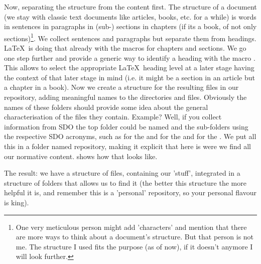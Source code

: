 
Now, separating the structure from the content first. The structure of a 
document (we stay with classic text documents like articles, books, etc. 
for a while) is words in sentences in paragraphs in (sub-) sections in 
chapters (if its a book, of not only sections)\footnote{One very 
meticulous person might add 'characters' and mention that there are more 
ways to think about a document's structure. But that person is not me. The 
structure I used fits the purpose (as of now), if it doesn't anymore I 
will look further.}. We collect sentences and paragraphs but separate them 
from headings. \LaTeX~is doing that already with the macros for chapters and 
sections. We go one step further and provide a generic way to identify a 
heading with the  macro \cmd{\setheading}. This allows to select the appropriate
\LaTeX~heading level at a later stage having the context of that later stage in mind
(i.e. it might be a section in an article but a chapter in a book). Now we create 
a structure for the resulting files in our repository, adding meaningful names to 
the directories and files. Obviously the names of these folders should provide some
idea about the general characterisation of the files they contain. Example? Well, if you collect 
information from \acs{SDO} the top folder 
could be named  and the sub-folders using the 
respective \ac{SDO} acronyms, such as  for the  and 
 for the  and  for the
. We put all this in a folder named repository, making it explicit
that here is were we find all our normative content.
 shows how that looks like.


The result: we have a structure of files, containing our 'stuff', 
integrated in a structure of folders that allows us to find it (the better 
this structure the more helpful it is, and remember this is a 'personal' 
repository, so your personal flavour is king).